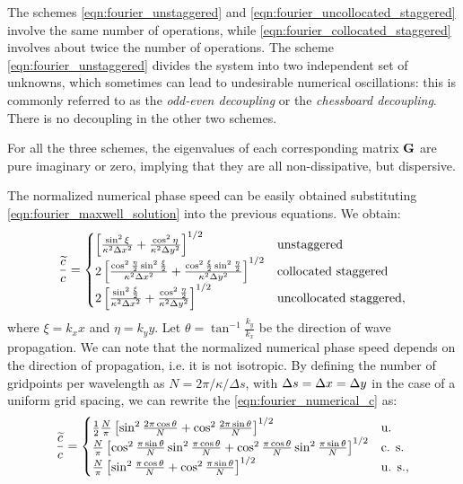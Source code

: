 The schemes \eqref{eqn:fourier_unstaggered} and
\eqref{eqn:fourier_uncollocated_staggered} involve the same number of
operations, while \eqref{eqn:fourier_collocated_staggered} involves about twice
the number of operations. The scheme \eqref{eqn:fourier_unstaggered} divides
the system into two independent set of unknowns, which sometimes can
lead to undesirable numerical oscillations: this is commonly referred
to as the \emph{odd-even decoupling} or the \emph{chessboard
  decoupling}. There is no decoupling in the other two schemes.

For all the three schemes, the eigenvalues of each corresponding
matrix $\mathbf{G}$ are pure imaginary or zero, implying that they
are all non-dissipative, but dispersive.

The normalized numerical phase speed can be easily obtained
substituting \eqref{eqn:fourier_maxwell_solution} into the previous
equations. We obtain:
\begin{equation} \label{eqn:fourier_numerical_c}
\frac{\widetilde{c}}{c} = \begin{cases}
  \left[ \frac{\sin^2 \xi}{\kappa^2 \Delta x^2} + \frac{\cos^2
  \eta}{\kappa^2 \Delta y^2} \right]^{1/2} & \text{unstaggered} \\
  2\left[ \frac{\cos^2 \frac{\eta}{2} \sin^2 \frac{\xi}{2}}{\kappa^2
  \Delta x^2} + \frac{\cos^2 \frac{\xi}{2} \sin^2
  \frac{\eta}{2}}{\kappa^2 \Delta y^2} \right]^{1/2} &
  \text{collocated staggered} \\
  2\left[ \frac{\sin^2 \frac{\xi}{2}}{\kappa^2 \Delta x^2} + \frac{\cos^2
  \frac{\eta}{2}}{\kappa^2 \Delta y^2} \right]^{1/2} &
  \text{uncollocated staggered} ,
  \end{cases}
\end{equation}
where $\xi = k_x x$ and $\eta = k_y y$. Let $\theta = \tan^{-1}
\frac{k_y}{k_x}$ be the direction of wave propagation. We can note
that the normalized numerical phase speed depends on the direction of
propagation, i.e. it is not isotropic. By defining the number of
gridpoints per wavelength as $N = 2\pi/\kappa / \Delta s$, with
$\Delta s = \Delta x = \Delta y$ in the case of a uniform grid spacing,
we can rewrite the \eqref{eqn:fourier_numerical_c} as:
\begin{equation} \label{eqn:fourier_numerical_c2}
\frac{\widetilde{c}}{c} = \begin{cases}
  \frac{1}{2}\frac{N}{\pi}\left[ \sin^2 \frac{2\pi \cos \theta}{N} + \cos^2
  \frac{2\pi \sin \theta}{N} \right]^{1/2} & \text{u.} \\
  \frac{N}{\pi}\left[ \cos^2 \frac{\pi \sin \theta}{N} \sin^2
  \frac{\pi \cos \theta}{N} + \cos^2 \frac{\pi \cos \theta}{N} \sin^2
  \frac{\pi \sin \theta}{N} \right]^{1/2} &
  \text{c. s.} \\
  \frac{N}{\pi} \left[ \sin^2 \frac{\pi \cos \theta}{N} + \cos^2
  \frac{\pi \sin \theta}{N} \right]^{1/2} &
  \text{u. s.} ,
  \end{cases}
\end{equation}

